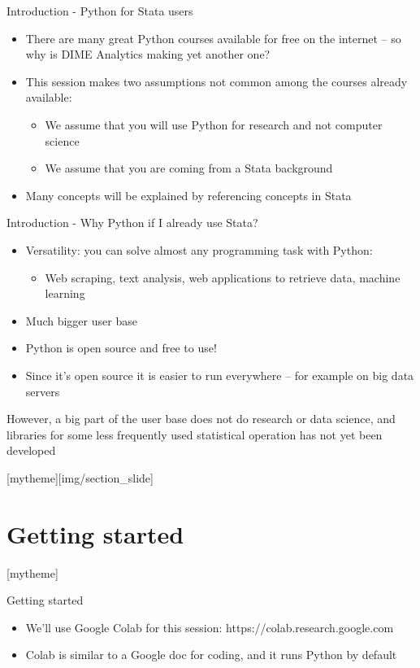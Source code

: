 \documentclass[aspectratio=169]{beamer}
\newcommand{\sectionpic}[2]{
	\setbeamertemplate{section page}[mytheme][#2]
	\section{#1}
	\setbeamertemplate{section page}[mytheme]
}
\begin{document}
\begin{frame}{Introduction - Python for Stata users}
	
	\begin{itemize}
		\item There are many great Python courses available for free on the internet -- so why is DIME Analytics making yet another one?
		\item This session makes two assumptions not common among the courses already available:
		\begin{itemize}
			\item We assume that you will use Python for research and not computer science
			\item We assume that you are coming from a Stata background 
		\end{itemize}
		\item Many concepts will be explained by referencing concepts in Stata
	\end{itemize}
	
\end{frame}

\begin{frame}{Introduction - Why Python if I already use Stata?}

	\begin{itemize}
		\item Versatility: you can solve almost any programming task with Python:
		\begin{itemize}
			\item Web scraping, text analysis, web applications to retrieve data, machine learning
		\end{itemize}
		\item Much bigger user base
		\item Python is open source and free to use!
		\item Since it's open source it is easier to run everywhere -- for example on big data servers
	\end{itemize}

	However, a big part of the user base does not do research or data science, 
	and libraries for some less frequently used statistical operation 
	has not yet been developed

\end{frame}

\sectionpic{Getting started}{img/section_slide}

\begin{frame}{Getting started}

	\begin{itemize}
		\item We'll use Google Colab for this session: https://colab.research.google.com
		\item Colab is similar to a Google doc for coding, and it runs Python by default
	\end{itemize}

\end{frame}
\end{document}
